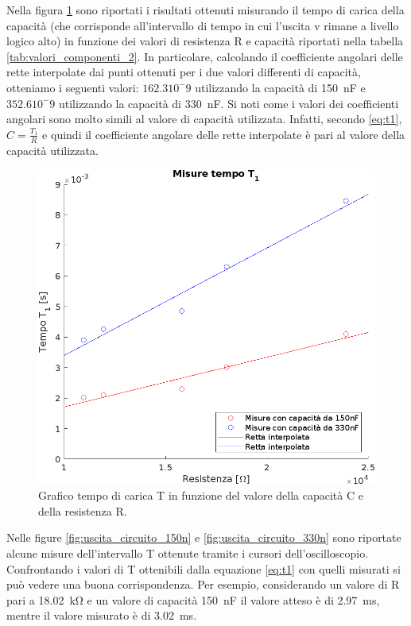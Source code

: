 \noindent
Nella figura \ref{fig:misure_t1} sono riportati i risultati ottenuti misurando il tempo di carica della capacità (che corrisponde all'intervallo di tempo in cui l'uscita v rimane a livello logico alto) in funzione dei valori di resistenza R e capacità riportati nella tabella \ref{tab:valori_componenti_2}. In particolare, calcolando il coefficiente angolari delle rette interpolate dai punti ottenuti per i due valori differenti di capacità, otteniamo i seguenti valori: $162.3 10^-9$ utilizzando la capacità di \SI{150}{\nano\farad} e $352.6 10^-9$ utilizzando la capacità di \SI{330}{\nano\farad}. Si noti come i valori dei coefficienti angolari sono molto simili al valore di capacità utilizzata. Infatti, secondo \ref{eq:t1}, $C=\frac{T_1}{R}$ e quindi il coefficiente angolare delle rette interpolate è pari al valore della capacità utilizzata.
\begin{figure}[h]
	\centering
	\includegraphics[width=0.5\linewidth]{./ImageFiles/Laboratorio 4/Misure tempo t1}
	\caption{Grafico tempo di carica T in funzione del valore della capacità C e della resistenza R.}
	\label{fig:misure_t1}
\end{figure}
Nelle figure \ref{fig:uscita_circuito_150n} e \ref{fig:uscita_circuito_330n} sono riportate alcune misure dell'intervallo T ottenute tramite i cursori dell'oscilloscopio. Confrontando i valori di T ottenibili dalla equazione \ref{eq:t1} con quelli misurati si può vedere una buona corrispondenza. Per esempio, considerando un valore di R pari a \SI{18.02}{\kilo\ohm} e un valore di capacità \SI{150}{\nano\farad} il valore atteso è di \SI{2.97}{\milli\second}, mentre il valore misurato è di \SI{3.02}{\milli\second}. 

